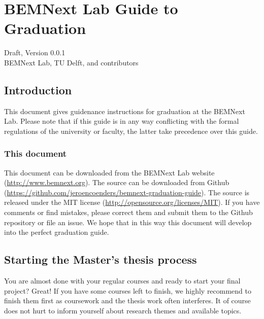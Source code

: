 \documentclass{latex-format/stylesheets/BEMNextstyle}
\begin{document}
\pagestyle{trail}
\mainmatter
\cleardoublepage
{}
{}
\chapter*{BEMNext Lab Guide to Graduation}
Draft, Version 0.0.1\\
BEMNext Lab, TU Delft, and contributors

\section*{Introduction}
This document gives guidenance instructions for graduation at the BEMNext Lab.  Please note that if this guide is in any way conflicting with the formal regulations of the university or faculty, the latter take precedence over this guide.

\subsection*{This document}
This document can be downloaded from the BEMNext Lab website (\url{http://www.bemnext.org}). The source can be downloaded from Github (\url{https://github.com/jeroencoenders/bemnext-graduation-guide}). The source is released under the MIT license (\url{http://opensource.org/licenses/MIT}). If you have comments or find mistakes, please correct them and submit them to the Github repository or file an issue. We hope that in this way this document will develop into the perfect graduation guide.

\section*{Starting the Master's thesis process}
You are almost done with your regular courses and ready to start your final project? Great! If you have some courses left to finish, we highly recommend to finish them first as coursework and the thesis work often interferes. It of course does not hurt to inform yourself about research themes and available topics.
\end{document}
